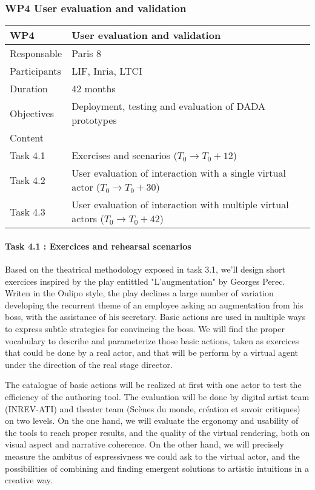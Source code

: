 \subsubsection{WP4 User evaluation and validation}


\begin{center}
\begin{tabular}{|l|l|}\hline
WP4 &  User evaluation and validation \\\hline
Responsable &  Paris 8  \\\hline
Participants &  LIF, Inria, LTCI\\\hline
Duration  &   42 months \\\hline
Objectives &  Deployment, testing and evaluation of DADA prototypes  \\\hline
Content &  \\\hline
Task 4.1 & Exercises and scenarios   ($T_0 \rightarrow  T_0+12$) \\\hline
Task 4.2 & User evaluation of interaction with a single virtual actor  ($T_0 \rightarrow  T_0+30$) \\\hline
Task 4.3 &  User evaluation of interaction with multiple virtual actors  ($T_0 \rightarrow  T_0+42$) \\\hline
\end{tabular}
\end{center}

\paragraph{Task 4.1 : Exercices and rehearsal scenarios}

Based on the theatrical methodology exposed in task 3.1, we'll design short exercices inspired by the play entittled  "L'augmentation" by Georges Perec. Writen in the Oulipo style, the play declines a large number of variation developing the recurrent theme of an employee asking an augmentation from his boss, with the assistance of his secretary.  Basic  actions are used in multiple ways to express subtle strategies for convincing the boss. We will find the proper vocabulary to describe and parameterize those basic actions, taken as exercices that could be done by a real actor, and that will be perform by a virtual agent under the direction of the real stage director. 

The catalogue of basic actions will be realized at first with one actor to test the efficiency of the authoring tool. The evaluation will be done by digital artist team (INREV-ATI) and theater team (Sc\`enes du monde, cr\'eation et savoir critiques) on two levels. On the one hand, we will evaluate the ergonomy and usability of the tools to reach proper results, and the quality of the virtual rendering, both on visual aspect and narrative coherence.  On the other hand, we will precisely measure the ambitus of espressivness we could ask to the virtual actor, and the possibilities of combining and finding emergent solutions to artistic intuitions in a creative way. 

